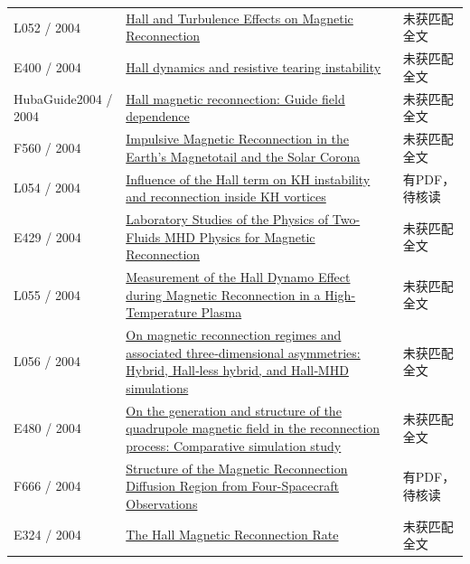 \begin{longtable}{P{24mm}P{97mm}P{27mm}}
L052 / 2004 & \href{https://doi.org/10.1029/2003gl018689}{Hall and Turbulence Effects on Magnetic Reconnection} & 未获匹配全文\\

E400 / 2004 & \href{https://doi.org/10.1017/s0022377804002880}{Hall dynamics and resistive tearing instability} & 未获匹配全文\\

HubaGuide2004 / 2004 & \href{https://doi.org/10.1063/1.1834592}{Hall magnetic reconnection: Guide field dependence} & 未获匹配全文\\

F560 / 2004 & \href{https://doi.org/10.1146/annurev.astro.42.053102.134039}{Impulsive Magnetic Reconnection in the Earth's Magnetotail and the Solar Corona} & 未获匹配全文\\

L054 / 2004 & \href{https://doi.org/10.5194/angeo-22-935-2004}{Influence of the Hall term on KH instability and reconnection inside KH vortices} & 有PDF，待核读\\

E429 / 2004 & \href{http://ui.adsabs.harvard.edu/abs/2004AGUFMSM51D..07Y/abstract}{Laboratory Studies of the Physics of Two-Fluids MHD Physics for Magnetic Reconnection} & 未获匹配全文\\

L055 / 2004 & \href{https://doi.org/10.1103/physrevlett.93.045002}{Measurement of the Hall Dynamo Effect during Magnetic Reconnection in a High-Temperature Plasma} & 未获匹配全文\\

L056 / 2004 & \href{https://doi.org/10.1029/2004ja010478}{On magnetic reconnection regimes and associated three‐dimensional asymmetries: Hybrid,  Hall‐less hybrid,  and Hall‐MHD simulations} & 未获匹配全文\\

E480 / 2004 & \href{https://doi.org/10.1029/2004gl019553}{On the generation and structure of the quadrupole magnetic field in the reconnection process: Comparative simulation study} & 未获匹配全文\\

F666 / 2004 & \href{https://doi.org/10.1103/physrevlett.93.105001}{Structure of the Magnetic Reconnection Diffusion Region from Four-Spacecraft Observations} & 有PDF，待核读\\

E324 / 2004 & \href{http://ui.adsabs.harvard.edu/abs/2004APS..DPPBP1080H/abstract}{The Hall Magnetic Reconnection Rate} & 未获匹配全文\\


\end{longtable}
